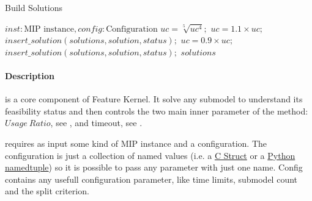 \begin{algorithm}[H]
    \caption{Build Solutions}\label{algo:build-solutions}
    \begin{algorithmic}[1]
        \REQUIRE $inst: \text{MIP instance}, config: \text{Configuration}$
         
                \STATE $uc = \sqrt[5]{uc^4};$ 
                \STATE $uc = 1.1 \times uc;$ 
                \STATE $insert\_solution(solutions, solution, status);$
                \STATE $uc = 0.9 \times uc;$ 
                \STATE $insert\_solution(solutions, solution, status);$
                \ENDIF
            \ENDIF
        \ENDFOR
        \RETURN $solutions$
    \end{algorithmic}
\end{algorithm}

\paragraph{Description}  is a core component of Feature Kernel. It solve any submodel to understand its feasibility status and then controls 
the two main inner parameter of the method: $Usage\ Ratio$, see , and timeout, see .

 requires as input some kind of MIP instance and a configuration. The configuration is just a collection of named values 
(i.e. a \href{https://en.wikipedia.org/wiki/Struct_(C_programming_language)}{C Struct} or a 
\href{https://docs.python.org/3/library/collections.html#namedtuple-factory-function-for-tuples-with-named-fields}{Python namedtuple}) 
so it is possible to pass any parameter with just one name. Config contains any usefull configuration parameter, like time limits, submodel count and the split 
criterion. 






